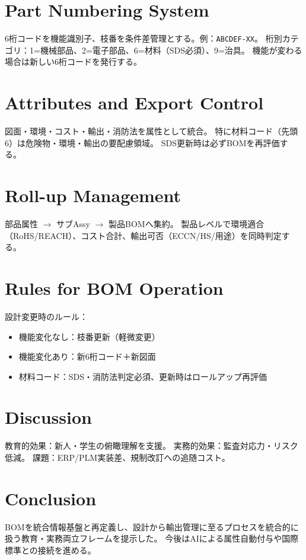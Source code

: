 \documentclass[conference]{IEEEtran}
\begin{document}
\begin{CJK}{UTF8}{min}
\section{Part Numbering System}
6桁コードを機能識別子、枝番を条件差管理とする。例：\texttt{ABCDEF-XX}。  
桁別カテゴリ：1=機械部品、2=電子部品、6=材料（SDS必須）、9=治具。  
機能が変わる場合は新しい6桁コードを発行する。

\section{Attributes and Export Control}
図面・環境・コスト・輸出・消防法を属性として統合。  
特に材料コード（先頭6）は危険物・環境・輸出の要配慮領域。  
SDS更新時は必ずBOMを再評価する。

\section{Roll-up Management}
部品属性 $\rightarrow$ サブAssy $\rightarrow$ 製品BOMへ集約。  
製品レベルで環境適合（RoHS/REACH）、コスト合計、輸出可否（ECCN/HS/用途）を同時判定する。

\section{Rules for BOM Operation}
設計変更時のルール：
\begin{itemize}
  \item 機能変化なし：枝番更新（軽微変更）
  \item 機能変化あり：新6桁コード＋新図面
  \item 材料コード：SDS・消防法判定必須、更新時はロールアップ再評価
\end{itemize}

\section{Discussion}
教育的効果：新人・学生の俯瞰理解を支援。  
実務的効果：監査対応力・リスク低減。  
課題：ERP/PLM実装差、規制改訂への追随コスト。

\section{Conclusion}
BOMを統合情報基盤と再定義し、設計から輸出管理に至るプロセスを統合的に扱う教育・実務両立フレームを提示した。  
今後はAIによる属性自動付与や国際標準との接続を進める。


\end{CJK}
\end{document}
